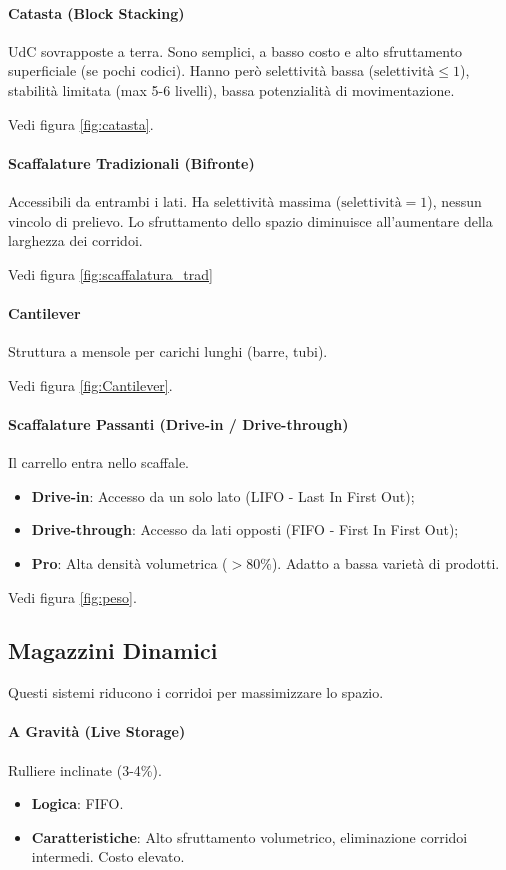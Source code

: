 \paragraph{Catasta (Block Stacking)} UdC sovrapposte a terra.
Sono semplici, a basso costo e alto sfruttamento superficiale (se pochi codici).
Hanno però selettività bassa ($ \text{selettività}\leq 1 $), stabilità limitata (max 5-6 livelli), bassa potenzialità di movimentazione.

Vedi figura \ref{fig:catasta}.
%
\paragraph{Scaffalature Tradizionali (Bifronte)} Accessibili da entrambi i lati. Ha selettività massima ($ \text{selettività} = 1 $), nessun vincolo di prelievo. Lo sfruttamento dello spazio diminuisce all'aumentare della larghezza dei corridoi.

Vedi figura \ref{fig:scaffalatura_trad}
%
\paragraph{Cantilever}
Struttura a mensole per carichi lunghi (barre, tubi).

Vedi figura \ref{fig:Cantilever}.

%
\paragraph{Scaffalature Passanti (Drive-in / Drive-through)} Il carrello entra nello scaffale.
\begin{itemize}
    \item \textbf{Drive-in}: Accesso da un solo lato (LIFO - Last In First Out);
    \item \textbf{Drive-through}: Accesso da lati opposti (FIFO - First In First Out);
    \item \textbf{Pro}: Alta densità volumetrica ($ >80\% $). Adatto a bassa varietà di prodotti.
\end{itemize}

Vedi figura \ref{fig:peso}.
%
\subsection{Magazzini Dinamici}
Questi sistemi riducono i corridoi per massimizzare lo spazio.
%
\paragraph{A Gravità (Live Storage)} Rulliere inclinate (3-4\%).
\begin{itemize}
    \item \textbf{Logica}: FIFO.
    \item \textbf{Caratteristiche}: Alto sfruttamento volumetrico, eliminazione corridoi intermedi. Costo elevato.
\end{itemize}
%
